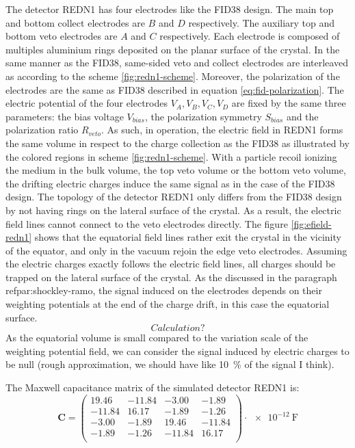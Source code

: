 The detector REDN1 has four electrodes like the FID38 design. The main top and bottom collect electrodes are $B$ and $D$ respectively. The auxiliary top and bottom veto electrodes are $A$ and $C$ respectively. Each electrode is composed of multiples aluminium rings deposited on the planar surface of the crystal. In the same manner as the FID38, same-sided veto and collect electrodes are interleaved as according to the scheme \ref{fig:redn1-scheme}. Moreover, the polarization of the electrodes are the same as FID38 described in equation \ref{eq:fid-polarization}. The electric potential of the four electrodes $V_A, V_B, V_C, V_D$ are fixed by the same three parameters: the bias voltage $V_{bias}$, the polarization symmetry $S_{bias}$ and the polarization ratio $R_{veto}$. As such, in operation, the electric field in REDN1 forms the same volume in respect to the charge collection as the FID38 as illustrated by the colored regions in scheme \ref{fig:redn1-scheme}. With a particle recoil ionizing the medium in the bulk volume, the top veto volume or the bottom veto volume, the drifting electric charges induce the same signal as in the case of the FID38 design. The topology of the detector REDN1 only differs from the FID38 design by not having rings on the lateral surface of the crystal. As a result, the electric field lines cannot connect to the veto electrodes directly. The figure \ref{fig:efield-redn1} shows that the equatorial field lines rather exit the crystal in the vicinity of the equator, and only in the vacuum rejoin the edge veto electrodes. Assuming the electric charges exactly follows the electric field lines, all charges should be trapped on the lateral surface of the crystal. As the discussed in the paragraph ref{par:shockley-ramo}, the signal induced on the electrodes depends on their weighting potentials at the end of the charge drift, in this case the equatorial surface.
$$ Calculation ? $$
As the equatorial volume is small compared to the variation scale of the weighting potential field, we can consider the signal induced by electric charges to be null (rough approximation, we should have like \SI{10}{\percent} of the signal I think).

The Maxwell capacitance matrix of the simulated detector REDN1 is:
\begin{equation}
\bm{C} = 
\begin{pmatrix}
  19.46 & -11.84 & -3.00 & -1.89\\
  -11.84 & 16.17 & -1.89 & -1.26\\
  -3.00 & -1.89 & 19.46 & -11.84\\
  -1.89 & -1.26 & -11.84 & 16.17\\
\end{pmatrix}
\cdot \SI{e-12}{\farad}
\end{equation}


